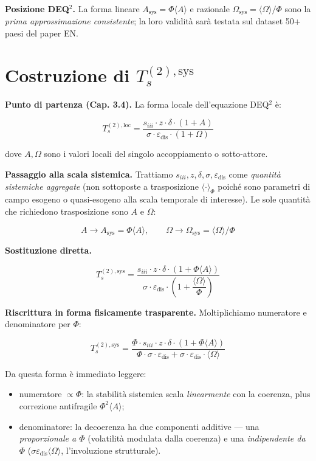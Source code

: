 \Proved{} \textbf{Posizione DEQ$^2$. } La forma lineare
\(A_{\text{sys}} = \Phi\langle A\rangle\) e razionale
\(\Omega_{\text{sys}} = \langle\Omega\rangle/\Phi\) sono la \emph{prima
approssimazione consistente}; la loro validità sarà testata sul dataset
50+ paesi del paper EN.



\section{\texorpdfstring{Costruzione di
\(T_s^{(2),\text{sys}}\)}{Costruzione di T\_s\^{}\{(2),\textbackslash text\{sys\}\}}}\label{costruzione-di-t_s2textsys}

\Proved{} \textbf{Punto di partenza (Cap. 3.4).} La forma locale
dell'equazione DEQ$^2$ è:

\[
T_s^{(2),\text{loc}} = \frac{s_{iii} \cdot z \cdot \delta \cdot (1+A)}{\sigma \cdot \varepsilon_{\text{dis}} \cdot (1+\Omega)}
\]

dove \(A, \Omega\) sono i valori locali del singolo accoppiamento o
sotto-attore.

\Hypoth{} \textbf{Passaggio alla scala sistemica.} Trattiamo
\(s_{iii}, z, \delta, \sigma, \varepsilon_{\text{dis}}\) come
\emph{quantità sistemiche aggregate} (non sottoposte a trasposizione
\(\langle \cdot \rangle_\Phi\) poiché sono parametri di campo esogeno o
quasi-esogeno alla scala temporale di interesse). Le sole quantità che
richiedono trasposizione sono \(A\) e \(\Omega\):

\[
A \to A_{\text{sys}} = \Phi \langle A\rangle, \qquad \Omega \to \Omega_{\text{sys}} = \langle\Omega\rangle/\Phi
\]

\Proved{} \textbf{Sostituzione diretta.}

\[
\boxed{T_s^{(2),\text{sys}} = \frac{s_{iii} \cdot z \cdot \delta \cdot (1 + \Phi \langle A\rangle)}{\sigma \cdot \varepsilon_{\text{dis}} \cdot \left(1 + \dfrac{\langle\Omega\rangle}{\Phi}\right)}}
\]

\Proved{} \textbf{Riscrittura in forma fisicamente trasparente.}
Moltiplichiamo numeratore e denominatore per \(\Phi\):

\[
T_s^{(2),\text{sys}} = \frac{\Phi \cdot s_{iii} \cdot z \cdot \delta \cdot (1 + \Phi \langle A\rangle)}{\Phi \cdot \sigma \cdot \varepsilon_{\text{dis}} + \sigma \cdot \varepsilon_{\text{dis}} \cdot \langle\Omega\rangle}
\]

Da questa forma è immediato leggere:

\begin{itemize}
\tightlist
\item
  numeratore \(\propto \Phi\): la stabilità sistemica scala
  \emph{linearmente} con la coerenza, plus correzione antifragile
  \(\Phi^2 \langle A\rangle\);
\item
  denominatore: la decoerenza ha due componenti additive --- una
  \emph{proporzionale a \(\Phi\)} (volatilità modulata dalla coerenza) e
  una \emph{indipendente da \(\Phi\)}
  (\(\sigma \varepsilon_{\text{dis}} \langle\Omega\rangle\),
  l'involuzione strutturale).
\end{itemize}




